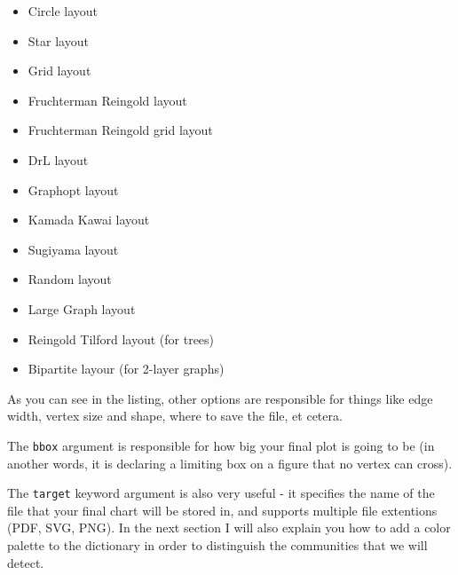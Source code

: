\documentclass[12pt, a4paper]{article}
\begin{document}
\begin{multicols}{2}
  \begin{itemize}
  \item Circle layout
  \item Star layout
  \item Grid layout
  \item Fruchterman Reingold layout \cite{yt_layout_fg}
  \item Fruchterman Reingold grid layout
  \item DrL layout \cite{yt_layout_dl}
  \item Graphopt layout \cite{yt_layout_graphopt}
  \item Kamada Kawai layout \cite{yt_layout_kk}
  \item Sugiyama layout \cite{yt_layout_sg}
  \item Random layout
  \item Large Graph layout
  \item Reingold Tilford layout (for trees) \cite{yt_layout_ft}
  \item Bipartite layour (for 2-layer graphs)
  \end{itemize}
\end{multicols}


As you can see in the listing, other options are responsible for things like edge width, vertex size and shape, where to save the file, et cetera.

The \texttt{bbox} argument is responsible for how big your final plot is going to be (in another words, it is declaring a limiting box on a figure that no vertex can cross).

The \texttt{target} keyword argument is also very useful - it specifies the name of the file that your final chart will be stored in, and supports multiple file extentions (PDF, SVG, PNG).  In the next section I will also explain you how to add a color palette to the dictionary in order to distinguish the communities that we will detect.

\bgroup
  \inputminted[linenos, breaklines=true, fontsize=\scriptsize, firstnumber=last]{python}{src/youtube/hdg/2_style_dict.py}
  \label{listing:iplot_2sd}
\egroup


\bgroup
  \inputminted[linenos, breaklines=true, fontsize=\scriptsize, firstnumber=last]{python}{src/youtube/hdg/3_plotting.py}
  \label{listing:iplot_3im}
\egroup
\end{document}

